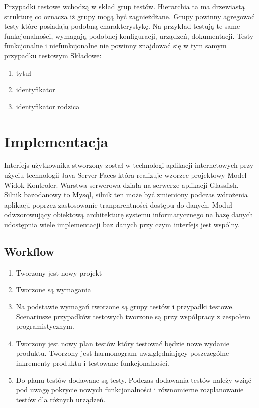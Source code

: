 Przypadki testowe wchodzą w skład grup testów. Hierarchia ta ma drzewiastą strukturę co oznacza iż grupy mogą być zagnieżdżane. Grupy powinny agregować testy które posiadają podobną charakterystykę. Na przykład testują te same funkcjonalności, wymagają podobnej konfiguracji, urządzeń, dokumentacji. Testy funkcjonalne i niefunkcjonalne nie powinny znajdować się w tym samym przypadku testowym Składowe:
\begin{enumerate}
  \item  tytuł
  \item identyfikator
  \item identyfikator rodzica
\end{enumerate}
 



\chapter{Implementacja}
Interfejs użytkownika stworzony został w technologi aplikacji internetowych przy użyciu technologii Java Server Faces która realizuje wzorzec projektowy  Model-Widok-Kontroler. Warstwa serwerowa działa na serwerze aplikacji Glassfish. Silnik bazodanowy to Mysql, silnik ten może być zmieniony podczas wdrożenia aplikacji poprzez zastosowanie tranparentności dostępu do danych. Moduł odwzorowujący obiektową architekturę systemu informatycznego na bazę danych udostępnia wiele implementacji baz danych przy czym interfejs jest wspólny.



\section{Workflow}
\begin{enumerate}
  \item Tworzony jest nowy projekt
  \item Tworzone są wymagania
  \item Na podstawie wymagań tworzone są grupy testów i przypadki testowe. Scenariusze przypadków testowych tworzone są przy współpracy z zespołem programistycznym.
  \item Tworzony jest nowy plan testów który testować będzie nowe wydanie produktu. Tworzony jest harmonogram uwzlględniający poszczególne inkrementy produktu i testowane funkcjonalności.
  \item Do planu testów dodawane są testy. Podczas dodawania testów należy wziąć pod uwagę pokrycie nowych funkcjonalności i równomierne rozplanowanie testów dla różnych urządzeń.

\end{enumerate}
